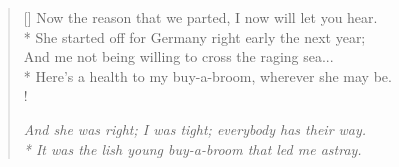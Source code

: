 \documentclass[MAIN]{subfiles}
\begin{document}
\begin{verse}[\versewidth]
Now the reason that we parted, I now will let you hear.\\*
She started off for Germany right early the next year;\\
And me not being willing to cross the raging sea...\\*
Here's a health to my buy-a-broom, wherever she may be.\\!

{\it And she was right; I was tight; everybody has their way.\\*
It was the lish young buy-a-broom that led me astray.}

\end{verse}
\end{document}
